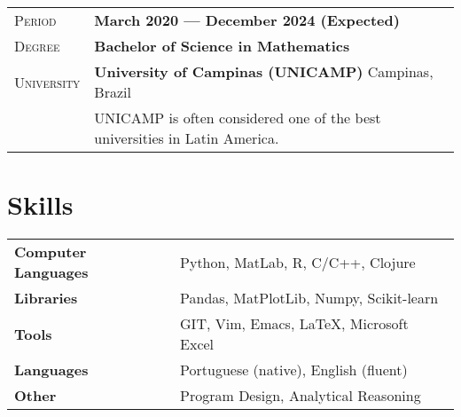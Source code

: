 \documentclass[a4paper, oneside, final]{scrartcl} %
\newcommand{\gray}{\rowcolor[gray]{.90}} %
\begin{document}
\begin{center}
\begin{tabularx}{0.97\linewidth}{>{\raggedleft\scshape}p{2cm}X}
\gray Period & \textbf{March 2020 --- December 2024 (Expected)}\\
\gray Degree & \textbf{Bachelor of Science in Mathematics}\\
\gray University & \textbf{University of Campinas (UNICAMP)} \hfill Campinas, Brazil\\
    & UNICAMP is often considered one of the best universities in Latin America.
\end{tabularx}

\vspace{12pt}



\section{Skills}

\begin{tabular}{ @{} >{\bfseries}l @{\hspace{6ex}} l }
Computer Languages & Python, MatLab, R, C/C++, Clojure \\
Libraries & Pandas, MatPlotLib, Numpy, Scikit-learn \\
Tools & GIT, Vim, Emacs, \LaTeX, Microsoft Excel \\
Languages & Portuguese (native), English (fluent) \\
Other & Program Design, Analytical Reasoning
\end{tabular}


\end{center}
\end{document}
